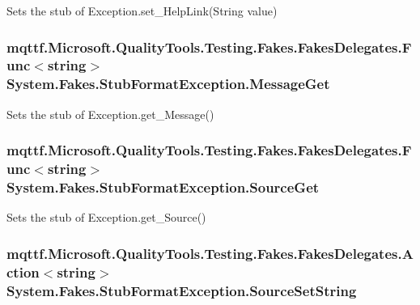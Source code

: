 Sets the stub of Exception.\-set\-\_\-\-Help\-Link(\-String value)

\hypertarget{class_system_1_1_fakes_1_1_stub_format_exception_a220408e55f20bef3ce3c895ed10aa4a7}{
\subsubsection[{Message\-Get}]{\setlength{\rightskip}{0pt plus 5cm}mqttf.\-Microsoft.\-Quality\-Tools.\-Testing.\-Fakes.\-Fakes\-Delegates.\-Func$<$string$>$ System.\-Fakes.\-Stub\-Format\-Exception.\-Message\-Get}}\label{class_system_1_1_fakes_1_1_stub_format_exception_a220408e55f20bef3ce3c895ed10aa4a7}


Sets the stub of Exception.\-get\-\_\-\-Message()

\hypertarget{class_system_1_1_fakes_1_1_stub_format_exception_a0eb9b0f024b81fecbfa6f4c0889b6a6d}{
\subsubsection[{Source\-Get}]{\setlength{\rightskip}{0pt plus 5cm}mqttf.\-Microsoft.\-Quality\-Tools.\-Testing.\-Fakes.\-Fakes\-Delegates.\-Func$<$string$>$ System.\-Fakes.\-Stub\-Format\-Exception.\-Source\-Get}}\label{class_system_1_1_fakes_1_1_stub_format_exception_a0eb9b0f024b81fecbfa6f4c0889b6a6d}


Sets the stub of Exception.\-get\-\_\-\-Source()

\hypertarget{class_system_1_1_fakes_1_1_stub_format_exception_a0eb14c5ee088a30b8c69f72f319fed2c}{
\subsubsection[{Source\-Set\-String}]{\setlength{\rightskip}{0pt plus 5cm}mqttf.\-Microsoft.\-Quality\-Tools.\-Testing.\-Fakes.\-Fakes\-Delegates.\-Action$<$string$>$ System.\-Fakes.\-Stub\-Format\-Exception.\-Source\-Set\-String}}\label{class_system_1_1_fakes_1_1_stub_format_exception_a0eb14c5ee088a30b8c69f72f319fed2c}


